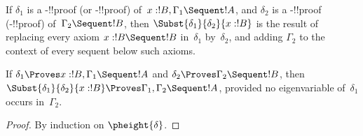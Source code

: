\documentclass[../../../include/open-logic-section]{subfiles}
\begin{document}
\begin{defn}
If $\delta_1$ is a -!!{proof} (or -!!{proof})
of~$x:!B, \Gamma_1 \Sequent !A$, and $\delta_2$ is a
-!!{proof} (-!!{proof}) of~$\Gamma_2 \Sequent !B$,
then $\Subst{\delta_1}{\delta_2}{x:!B}$ is the result of replacing
every axiom $x:!B \Sequent !B$ in~$\delta_1$ by~$\delta_2$, and adding
$\Gamma_2$ to the context of every sequent below such axioms.
\end{defn}

\begin{prop}
If $\delta_1 \Proves x:!B, \Gamma_1 \Sequent
!A$ and $\delta_2 \Proves \Gamma_2 \Sequent !B$, then
$\Subst{\delta_1}{\delta_2}{x:!B} \Proves \Gamma_1, \Gamma_2 \Sequent
!A$, provided no eigenvariable of~$\delta_1$ occurs in~$\Gamma_2$.
\end{prop}


\begin{proof}
  By induction on $\pheight{\delta}$.
\end{proof}
\end{document}
